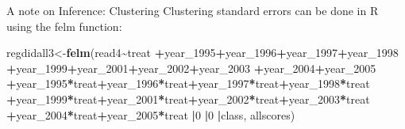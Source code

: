 \documentclass[
  ignorenonframetext,
]{beamer}
\newenvironment{Shaded}{\begin{snugshade}}{\end{snugshade}}
\newcommand{\DecValTok}[1]{\textcolor[rgb]{0.00,0.00,0.81}{#1}}
\newcommand{\KeywordTok}[1]{\textcolor[rgb]{0.13,0.29,0.53}{\textbf{#1}}}
\newcommand{\NormalTok}[1]{#1}
\newcommand{\OperatorTok}[1]{\textcolor[rgb]{0.81,0.36,0.00}{\textbf{#1}}}
\begin{document}
\begin{frame}[fragile]{A note on Inference: Clustering}
\protect\hypertarget{a-note-on-inference-clustering-1}{}
Clustering standard errors can be done in R using the felm function:
\tiny

\begin{Shaded}
\begin{Highlighting}[]
\NormalTok{regdidall3\textless{}{-}}\KeywordTok{felm}\NormalTok{(read4}\OperatorTok{\textasciitilde{}}\NormalTok{treat}
                 \OperatorTok{+}\NormalTok{year\_}\DecValTok{1995}\OperatorTok{+}\NormalTok{year\_}\DecValTok{1996}\OperatorTok{+}\NormalTok{year\_}\DecValTok{1997}\OperatorTok{+}\NormalTok{year\_}\DecValTok{1998}
                 \OperatorTok{+}\NormalTok{year\_}\DecValTok{1999}\OperatorTok{+}\NormalTok{year\_}\DecValTok{2001}\OperatorTok{+}\NormalTok{year\_}\DecValTok{2002}\OperatorTok{+}\NormalTok{year\_}\DecValTok{2003}
                 \OperatorTok{+}\NormalTok{year\_}\DecValTok{2004}\OperatorTok{+}\NormalTok{year\_}\DecValTok{2005}
                 \OperatorTok{+}\NormalTok{year\_}\DecValTok{1995}\OperatorTok{*}\NormalTok{treat}\OperatorTok{+}\NormalTok{year\_}\DecValTok{1996}\OperatorTok{*}\NormalTok{treat}\OperatorTok{+}\NormalTok{year\_}\DecValTok{1997}\OperatorTok{*}\NormalTok{treat}\OperatorTok{+}\NormalTok{year\_}\DecValTok{1998}\OperatorTok{*}\NormalTok{treat}
                 \OperatorTok{+}\NormalTok{year\_}\DecValTok{1999}\OperatorTok{*}\NormalTok{treat}\OperatorTok{+}\NormalTok{year\_}\DecValTok{2001}\OperatorTok{*}\NormalTok{treat}\OperatorTok{+}\NormalTok{year\_}\DecValTok{2002}\OperatorTok{*}\NormalTok{treat}\OperatorTok{+}\NormalTok{year\_}\DecValTok{2003}\OperatorTok{*}\NormalTok{treat}
                 \OperatorTok{+}\NormalTok{year\_}\DecValTok{2004}\OperatorTok{*}\NormalTok{treat}\OperatorTok{+}\NormalTok{year\_}\DecValTok{2005}\OperatorTok{*}\NormalTok{treat}
                 \OperatorTok{|}\DecValTok{0}
                 \OperatorTok{|}\DecValTok{0}
                 \OperatorTok{|}\NormalTok{class,}
\NormalTok{                 allscores)}
\end{Highlighting}
\end{Shaded}
\end{frame}
\end{document}
